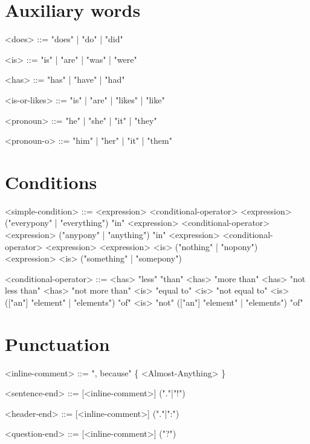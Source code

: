 \documentclass[12pt,a4paper]{article}
\begin{document}
\section{Auxiliary words}

\begin{grammar}

<does> ::= "does" | "do" | "did" 

<is> ::= "is" | "are" | "was" | "were"

<has> ::= "has" | "have" | "had"

<is-or-likes> ::= "is" | "are" | "likes" | "like"

<pronoun> ::= "he" | "she" | "it" | "they"

<pronoun-o> ::= "him" | "her" | "it" | "them"

\end{grammar}

\section{Conditions}

\begin{grammar}

<simple-condition> ::= <expression> <conditional-operator> <expression>
  \alt ("everypony" | "everything") "in" <expression> <conditional-operator> <expression>
  \alt ("anypony" | "anything") "in" <expression> <conditional-operator> <expression>
  \alt <expression> <is> ("nothing" | "nopony")
  \alt <expression> <is> ("something" | "somepony")
  
<conditional-operator> ::= <has> "less" "than"
  \alt <has> "more than"
  \alt <has> "not less than"
  \alt <has> "not more than"
  \alt <is> "equal to"
  \alt <is> "not equal to"
  \alt <is> (["an"] "element" | "elements") "of" 
  \alt <is> "not" (["an"] "element" | "elements") "of" 


\end{grammar}

\section{Punctuation}

\begin{grammar}

<inline-comment> ::= ", because" \{ <Almost-Anything> \}

<sentence-end> ::= [<inline-comment>] ("."|"!")

<header-end> ::= [<inline-comment>] ("."|":")

<question-end> ::= [<inline-comment>] ("?")

\end{grammar}
\end{document}
